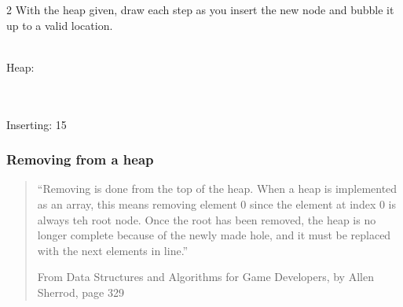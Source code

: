 \documentclass[a4paper,12pt,oneside]{book}
\newcounter{question}
\begin{document}
    \begin{question}{\thequestion}{2}
        With the heap given, draw each step as you insert the new node and
        bubble it up to a valid location. 

        ~\\
        Heap: ~\\~\\

        ~\\
        Inserting: 15
    \end{question}

    
    \newpage

    \subsubsection{Removing from a heap}

        \begin{quote}
            ``Removing is done from the top of the heap. When a heap is implemented
            as an array, this means removing element 0 since the element at index 0 is always
            teh root node. Once the root has been removed, the heap is no longer complete
            because of the newly made hole, and it must be replaced with the next elements in line.''
            
            \footnotesize
            From Data Structures and Algorithms for Game Developers, by Allen Sherrod, page 329            
        \end{quote}
		
\end{document}
